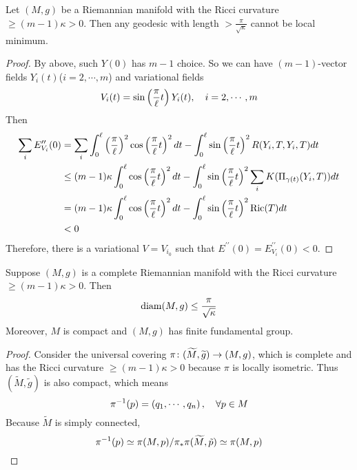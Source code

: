 \begin{enumerate}[label=\Roman{*}.]
	\begin{lem}[Myers]
		Let $(M,g)$ be a Riemannian manifold with the Ricci curvature $\geq (m-1)\kappa > 0$. Then any geodesic with length $> \frac{\pi}{\sqrt{\kappa}}$ cannot be local minimum.
	\end{lem}
	\begin{proof}
		By above, such $Y(0)$ has $m-1$ choice. So we can have $(m-1)$-vector fields $Y_i(t)$($i = 2,\cdots,m$) and variational fields
		\begin{equation*}
			V_i(t) = \sin\left(\frac{\pi}{\ell}t\right)Y_i(t),\quad i = 2,\cdots,m
		\end{equation*}
		Then
		\begin{equation*}
			\begin{aligned}
				\sum_i E_{V_i}^{\prime\prime}(0) &= \sum_i \int_0^\ell \left(\frac{\pi}{\ell}\right)^2\cos\left(\frac{\pi}{\ell}t\right)^2 dt - \int_0^\ell\sin\left(\frac{\pi}{\ell}t\right)^2 R(Y_i,T,Y_i,T)dt \\
				&\leq (m-1)\kappa \int_0^\ell \cos\left(\frac{\pi}{\ell}t\right)^2 dt - \int_0^\ell\sin\left(\frac{\pi}{\ell}t\right)^2 \sum_iK(\Pi_{\gamma(t)}(Y_i,T))dt \\
				&= (m-1)\kappa \int_0^\ell \cos\left(\frac{\pi}{\ell}t\right)^2 dt - \int_0^\ell\sin\left(\frac{\pi}{\ell}t\right)^2 \operatorname{Ric}(T)dt \\
				&< 0
			\end{aligned}
		\end{equation*}
		Therefore, there is a variational $V = V_{i_0}$ such that $E^{\prime\prime}(0) = E_{V_i}^{\prime\prime}(0) < 0$.
	\end{proof}

	\begin{thm}
		Suppose $(M,g)$ is a complete Riemannian manifold with the Ricci curvature $\geq (m-1)\kappa > 0$. Then
		\begin{equation*}
			\operatorname{diam}(M,g) \leq \frac{\pi}{\sqrt{\kappa}}
		\end{equation*}
		Moreover, $M$ is compact and $(M,g)$ has finite fundamental group.
	\end{thm}
	\begin{proof}
		Consider the universal covering $\pi \colon (\widetilde{M},\widetilde{g}) \rightarrow (M,g)$, which is complete and has the Ricci curvature $\geq (m-1)\kappa > 0$ because $\pi$ is locally isometric. Thus $(\widetilde{M},\widetilde{g})$ is also compact, which means
		\begin{equation*}
		 	\pi^{-1}(p) = \left(q_1,\cdots,q_n\right),\quad \forall p \in M
		\end{equation*}
		Because $\widetilde{M}$ is simply connected,
		\begin{equation*}
			\pi^{-1}(p) \simeq \pi(M,p) / \pi_*\pi(\widetilde{M},\tilde{p}) \simeq \pi(M,p) \qedhere
		\end{equation*}
	\end{proof}


\end{enumerate}
